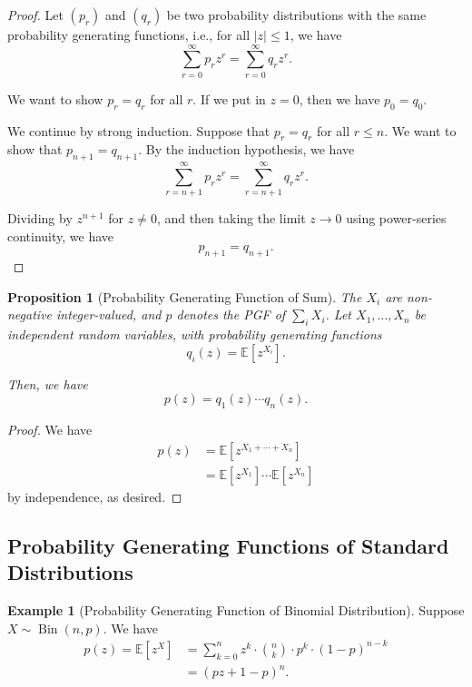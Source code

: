 \documentclass[11pt]{article}
\numberwithin{equation}{section}
\newtheorem{proposition}[theorem]{Proposition}
\theoremstyle{definition}
\newtheorem{example}[theorem]{Example}
\theoremstyle{remark}
\newcommand{\pqty}[1]{\left(#1\right)}
\newcommand{\bqty}[1]{\left[#1\right]}
\newcommand{\abs}[1]{\left|#1\right|}
\newcommand{\Expt}{\mathbb E}
\newcommand{\Binomial}{\operatorname{Bin}}
\begin{document}
\begin{proof}\label{probability-proof-040}
    Let \(\pqty{p_r}\) and \(\pqty{q_r}\) be two probability distributions with the same probability generating functions, i.e., for all \(\abs{z} \leq 1\), we have
    \[
        \sum_{r = 0}^{\infty} p_r z^r = \sum_{r = 0}^{\infty} q_r z^r.
    \]

    We want to show \(p_r = q_r\) for all \(r\). If we put in \(z = 0\), then we have \(p_0 = q_0\).

    We continue by strong induction. Suppose that \(p_r = q_r\) for all \(r \leq n\). We want to show that \(p_{n + 1} = q_{n + 1}\). By the induction hypothesis, we have
    \[
        \sum_{r = n + 1}^{\infty} p_r z^r = \sum_{r = n + 1}^{\infty} q_r z^r.
    \]

    Dividing by \(z^{n + 1}\) for \(z\ne0\), and then taking the limit \(z\to0\) using power-series continuity, we have
    \[
        p_{n + 1} = q_{n + 1}.
    \]
\end{proof}

\begin{proposition}[Probability Generating Function of Sum]\label{probability-proposition-024}
    \label{probability-prop:pgf-sum}
The \(X_i\) are non-negative integer-valued, and \(p\) denotes the PGF of \(\sum_iX_i\).
%
    Let \(X_1, \ldots, X_n\) be independent random variables, with probability generating functions
    \[
        q_i\pqty{z} = \Expt\bqty{z^{X_i}}.
    \]

    Then, we have
    \[
        p\pqty{z} = q_1\pqty{z} \cdots q_n\pqty{z}.
    \]
\end{proposition}

\begin{proof}\label{probability-proof-041}
    We have
    \begin{align*}
        p\pqty{z} &= \Expt\bqty{z^{X_1 + \cdots + X_n}} \\
        &= \Expt\bqty{z^{X_1}} \cdots \Expt\bqty{z^{X_n}}
    \end{align*}
    by independence, as desired.
\end{proof}

\subsection{Probability Generating Functions of Standard Distributions}

\begin{example}[Probability Generating Function of Binomial Distribution]\label{probability-example-031}
    \label{probability-ex:pgf-binomial}%
    Suppose \(X \sim \Binomial\pqty{n, p}\). We have
    \begin{align*}
        p\pqty{z} = \Expt\bqty{z^X} &= \sum_{k = 0}^{n} z^k \cdot \binom{n}{k} \cdot p^k \cdot \pqty{1 - p}^{n - k} \\
        &= \pqty{pz + 1 - p}^n.
    \end{align*}
\end{example}
\end{document}
